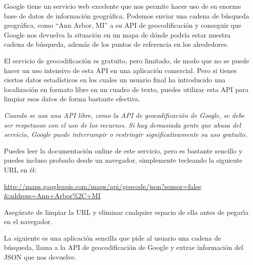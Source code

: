 Google tiene un servicio web excelente que nos permite hacer uso de su
enorme base de datos de información geográfica. Podemos enviar una cadena de búsqueda
geográfica, como ``Ann Arbor, MI'' a su API de geocodificación y conseguir que Google
nos devuelva la situación en un mapa de dónde podría estar nuestra cadena de
búsqueda, además de los puntos de referencia en los alrededores.

El servicio de geocodificación es gratuito, pero limitado, de modo que no se puede hacer
un uso intensivo de esta API en una aplicación comercial. Pero si tienes ciertos datos
estadísticos en los cuales un usuario final ha introducido una localización en formato
libre en un cuadro de texto, puedes utilizar esta API para limpiar esos datos de forma
bastante efectiva.

{\em Cuando se usa una API libre, como la API de geocodificación de Google, se debe ser
respetuoso con el uso de los recursos. Si hay demasiada gente que abusa del servicio,
Google puede interrumpir o restringir significativamente su uso gratuito.}

Puedes leer la documentación online de este servicio, pero es bastante sencillo
y puedes incluso probarlo desde un navegador, simplemente tecleando la siguiente URL
en él:

\url{http://maps.googleapis.com/maps/api/geocode/json?sensor=false &address=Ann+Arbor%2C+MI}

Asegúrate de limpiar la URL y eliminar cualquier espacio de ella antes de pegarla
en el navegador.

La siguiente es una aplicación sencilla que pide al usuario una cadena de búsqueda,
llama a la API de geocodificación de Google y extrae información del JSON que nos devuelve.

